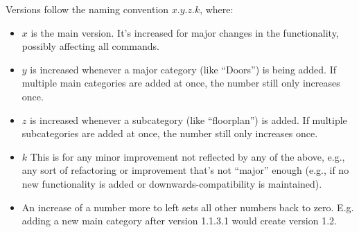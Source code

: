 \documentclass{article}
\begin{document}
Versions follow the naming convention $x.y.z.k$, where:
\begin{itemize}[nosep,parsep=3pt]
  \item $x$ is the main version. It's increased for major changes in the functionality, possibly affecting all commands.
  \item $y$ is increased whenever a major category (like ``Doors'') is being added. If multiple main categories are added at once, the number still only increases once.
  \item $z$ is increased whenever a subcategory (like ``floorplan'') is added. If multiple subcategories are added at once, the number still only increases once. 
  \item $k$ This is for any minor improvement not reflected by any of the above, e.g., any sort of refactoring or improvement that's not ``major'' enough (e.g., if no new functionality is added or downwards-compatibility is maintained). 
  \item An increase of a number more to left sets all other numbers back to zero. E.g. adding a new main category after version 1.1.3.1 would create version 1.2.
\end{itemize}
\end{document}
